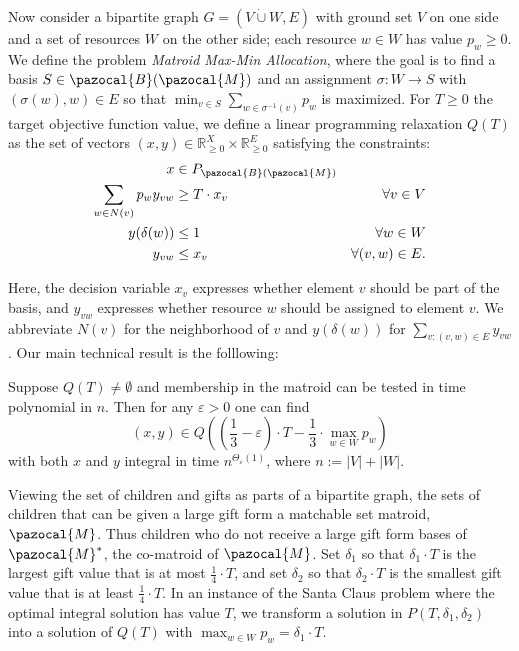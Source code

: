 Now consider a bipartite graph $G = (V \dot{\cup} W,E)$ with ground set $V$ on one side and
a set of resources $W$ on the other side; each resource $w \in W$ has
value $p_w \geq 0$. 
We define the problem \emph{Matroid Max-Min Allocation}, 
where the goal is to find a basis $S \in \pazocal{B}(\pazocal{M})$ and an 
assignment $\sigma : W \to S$ with $(\sigma(w),w) \in E$ so that $\min_{v \in S} \sum_{w \in \sigma^{-1}(v)} p_w$ 
is maximized. 
For $T \geq 0$ the target objective function value, 
we define a linear programming relaxation $Q(T)$ as the set of vectors 
$(x,y) \in \mathbb{R}_{\geq 0}^X \times \mathbb{R}_{\geq 0}^E$
satisfying the constraints:
\begin{align*}
 x &\in P_{\pazocal{B}(\pazocal{M})} &\\
 \sum_{w \in N(v)} p_wy_{vw} &\geq T \cdot x_v   &\forall v \in V\\
  \quad  y(\delta(w)) &\leq 1  &\forall w \in W\\
   y_{vw} &\leq x_v &\forall (v,w) \in E.
\end{align*} 

Here, the decision variable $x_v$ expresses whether element $v$ should be part of the basis, and
$y_{vw}$ expresses whether resource $w$ should be assigned to element $v$. We abbreviate 
$N(v)$ for the neighborhood of $v$ and $y(\delta(w))$ for $\sum_{v : (v,w) \in E} y_{vw}$.
Our main technical result is the folllowing: 
\begin{theorem}\label{thm:MainMatroidAlgorithm_intro} \cite{DaviesRZ20}
Suppose $Q(T) \neq \emptyset$ and membership in the matroid can be tested in time polynomial in $n$.
Then for any $\varepsilon>0$ one can find
 \[
   (x,y) \in Q \left (
    \left (\frac13 - \varepsilon \right ) \cdot T - \frac13 \cdot \max_{w \in W} p_w \right )
 \] 
with both $x$ and $y$ integral in time $n^{\Theta_{\varepsilon}(1)}$, where $n := |V| + |W|$. 
\end{theorem}


Viewing the set of children and gifts as parts of a bipartite graph, 
the sets of children that can be given a large gift form a matchable set matroid, $\pazocal{M}$.
Thus children who do not receive a large gift form bases of $\pazocal{M}^*$, the co-matroid of $\pazocal{M}$.
Set $\delta_1$ so that $\delta_1 \cdot T$ is the largest gift value that is at most
$\frac14 \cdot T$, and set $\delta_2$ so that $\delta_2 \cdot T$ is the smallest gift value that is at least $\frac14 \cdot T$. 
In an instance of the Santa Claus problem where the optimal integral solution has value $T$, 
we transform a solution in $P(T,\delta_1,\delta_2)$ into a solution of $Q(T)$ with $\max_{w \in W} p_w = \delta_1 \cdot T$.

